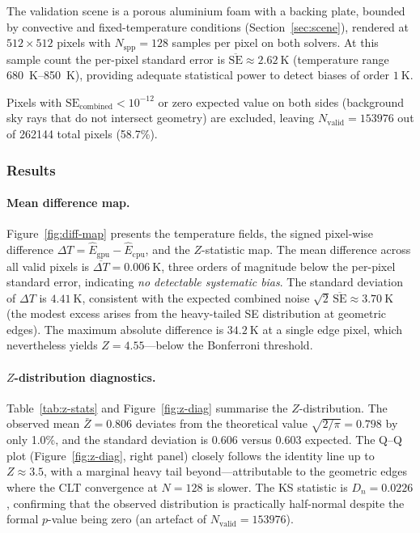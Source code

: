 The validation scene is a porous aluminium foam with a backing plate,
bounded by convective and fixed-temperature conditions
(Section~\ref{sec:scene}), rendered at $512\times512$ pixels with
$N_{\mathrm{spp}}=128$ samples per pixel on both solvers.
At this sample count the per-pixel standard error is
$\overline{\mathrm{SE}}\approx\SI{2.62}{\kelvin}$ (temperature range
\SIrange{680}{850}{\kelvin}), providing adequate statistical power to
detect biases of order $\SI{1}{\kelvin}$.

Pixels with $\mathrm{SE}_{\mathrm{combined}}<10^{-12}$ or zero
expected value on both sides (background sky rays that do not
intersect geometry) are excluded, leaving
$N_{\mathrm{valid}}=\num{153976}$ out of \num{262144} total pixels
(58.7\%).

\subsubsection{Results}

\paragraph{Mean difference map.}
Figure~\ref{fig:diff-map} presents the temperature fields, the signed
pixel-wise difference $\Delta T = \hat{E}_{\mathrm{gpu}} -
\hat{E}_{\mathrm{cpu}}$, and the $Z$-statistic map.  The mean
difference across all valid pixels is
$\overline{\Delta T}=\SI{+0.006}{\kelvin}$, three orders of magnitude
below the per-pixel standard error, indicating \emph{no detectable
systematic bias}.  The standard deviation of $\Delta T$ is
$\SI{4.41}{\kelvin}$, consistent with the expected combined
noise $\sqrt{2}\,\overline{\mathrm{SE}}\approx\SI{3.70}{\kelvin}$
(the modest excess arises from the heavy-tailed SE distribution at
geometric edges).  The maximum absolute difference is
$\SI{34.2}{\kelvin}$ at a single edge pixel, which nevertheless yields
$Z=4.55$---below the Bonferroni threshold.

\paragraph{$Z$-distribution diagnostics.}
Table~\ref{tab:z-stats} and Figure~\ref{fig:z-diag} summarise the
$Z$-distribution.  The observed mean $\bar{Z}=0.806$ deviates from
the theoretical value $\sqrt{2/\pi}=0.798$ by only 1.0\%, and the
standard deviation is $0.606$ versus $0.603$ expected.
The Q--Q plot (Figure~\ref{fig:z-diag}, right panel) closely follows
the identity line up to $Z\approx3.5$, with a marginal heavy tail
beyond---attributable to the geometric edges where the CLT convergence
at $N=128$ is slower.  The KS statistic is $D_n=0.0226$, confirming
that the observed distribution is practically half-normal despite the
formal $p$-value being zero (an artefact of
$N_{\mathrm{valid}}=\num{153976}$).

